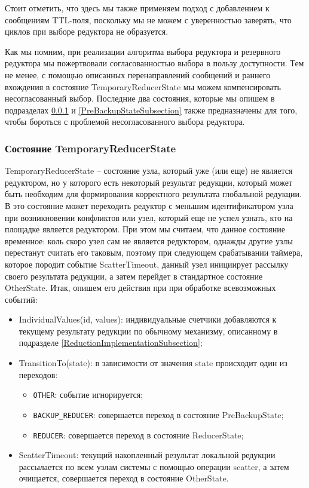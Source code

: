 \documentclass{article}
\theoremstyle{plain}
\theoremstyle{plain}
\theoremstyle{plain}
\theoremstyle{plain}
\theoremstyle{definition}
\theoremstyle{remark}
\theoremstyle{plain}
\begin{document}
Стоит отметить, что здесь мы также применяем подход с добавлением к сообщениям TTL-поля, поскольку мы не можем с уверенностью заверять, что циклов при выборе редуктора не образуется.

Как мы помним, при реализации алгоритма выбора редуктора и резервного редуктора мы пожертвовали согласованностью выбора в пользу доступности. Тем не менее, с помощью описанных перенаправлений сообщений и раннего вхождения в состояние TemporaryReducerState мы можем компенсировать несогласованный выбор. Последние два состояния, которые мы опишем в подразделах \ref{TemporaryReducerStateSubsection} и \ref{PreBackupStateSubsection} также предназначены для того, чтобы бороться с проблемой несогласованного выбора редуктора.

\subsubsection{Состояние TemporaryReducerState}
\label{TemporaryReducerStateSubsection}

TemporaryReducerState -- состояние узла, который уже (или еще) не является редуктором, но у которого есть некоторый результат редукции, который может быть необходим для формирования корректного результата глобальной редукции. В это состояние может переходить редуктор с меньшим идентификатором узла при возникновении конфликтов или узел, который еще не успел узнать, кто на площадке является редуктором. При этом мы считаем, что данное состояние временное: коль скоро узел сам не является редуктором, однажды другие узлы перестанут считать его таковым, поэтому при следующем срабатывании таймера, которое породит событие ScatterTimeout, данный узел инициирует рассылку своего результата редукции, а затем перейдет в стандартное состояние OtherState. Итак, опишем его действия при при обработке всевозможных событий:

\begin{itemize}
    \item IndividualValues(id, values): индивидуальные счетчики добавляются к текущему результату редукции по обычному механизму, описанному в подразделе \ref{ReductionImplementationSubsection};
    
    \item TransitionTo(state): в зависимости от значения state происходит один из переходов:
        
        \begin{itemize}
            \item \texttt{OTHER}: событие игнорируется;
            \item \texttt{BACKUP\_REDUCER}: совершается переход в состояние PreBackupState;
            \item \texttt{REDUCER}: совершается переход в состояние ReducerState;
        \end{itemize}
        
    \item ScatterTimeout: текущий накопленный результат локальной редукции рассылается по всем узлам системы с помощью операции scatter, а затем очищается, совершается переход в состояние OtherState.
\end{itemize}
\end{document}
